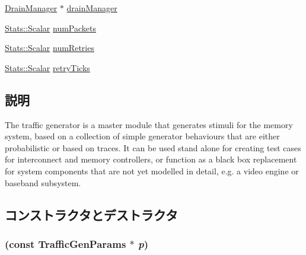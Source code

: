\begin{DoxyCompactItemize}
\item 
\hyperlink{classDrainManager}{DrainManager} $\ast$ \hyperlink{classTrafficGen_a329b71fb934a93312ca0aacbf5a3f982}{drainManager}
\item 
\hyperlink{classStats_1_1Scalar}{Stats::Scalar} \hyperlink{classTrafficGen_a5ffd7b0e5641784cc4c40547e51c6cbc}{numPackets}
\item 
\hyperlink{classStats_1_1Scalar}{Stats::Scalar} \hyperlink{classTrafficGen_a166f92adc8967f926459ca64c92d6a66}{numRetries}
\item 
\hyperlink{classStats_1_1Scalar}{Stats::Scalar} \hyperlink{classTrafficGen_a2d1dee1e20aeb0205ae665d7ad08b822}{retryTicks}
\end{DoxyCompactItemize}


\subsection{説明}
The traffic generator is a master module that generates stimuli for the memory system, based on a collection of simple generator behaviours that are either probabilistic or based on traces. It can be used stand alone for creating test cases for interconnect and memory controllers, or function as a black box replacement for system components that are not yet modelled in detail, e.g. a video engine or baseband subsystem. 

\subsection{コンストラクタとデストラクタ}
\hypertarget{classTrafficGen_a146890cf5f9e59c2f8c33edfb1502488}{
\subsubsection[{TrafficGen}]{ (const TrafficGenParams $\ast$ {\em p})}}
\label{classTrafficGen_a146890cf5f9e59c2f8c33edfb1502488}



